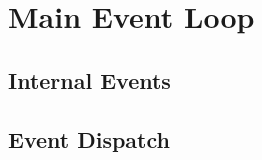 \section{Main Event Loop}
{ \textcolor{gray}\blindtext }

\subsection{Internal Events}
{ \textcolor{gray}\blindtext }

\subsection{Event Dispatch}
{ \textcolor{gray}\blindtext }

